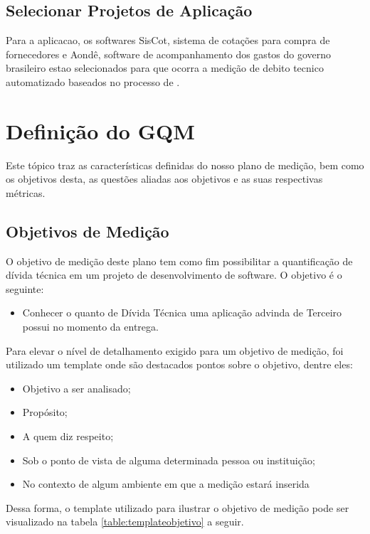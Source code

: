 \subsection{Selecionar Projetos de Aplicação}
Para a aplicacao, os softwares SisCot, sistema de cotações para compra de fornecedores e Aondê, software
de acompanhamento dos gastos do governo brasileiro estao selecionados para que ocorra a medição
de debito tecnico automatizado baseados no processo de \cite{td}.


\section{Definição do GQM}
Este tópico traz as características definidas do nosso plano de medição, bem como
os objetivos desta, as questões aliadas aos objetivos e as suas respectivas métricas.
\subsection{Objetivos de Medição}
O objetivo de medição deste plano tem como fim possibilitar a quantificação de
dívida técnica em um projeto de desenvolvimento de software. O objetivo é o
seguinte:

\begin{itemize}
  \item Conhecer o quanto de Dívida Técnica uma aplicação advinda de Terceiro
  possui no momento da entrega.
\end{itemize}

Para elevar o nível de detalhamento exigido para um objetivo de medição, foi
utilizado um template onde são destacados pontos sobre o objetivo, dentre eles:

\begin{itemize}
  \item Objetivo a ser analisado;
  \item Propósito;
  \item A quem diz respeito;
  \item Sob o ponto de vista de alguma determinada pessoa ou instituição;
  \item No contexto de algum ambiente em que a medição estará inserida
\end{itemize}

Dessa forma, o template utilizado para ilustrar o objetivo de medição pode ser
visualizado na tabela \ref{table:templateobjetivo} a seguir.
\\

